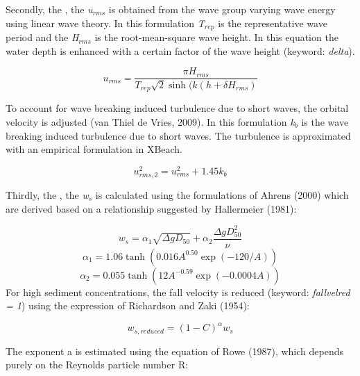 \documentclass{article}
\begin{document}
\noindent Secondly, the , the \textit{u${}_{rms}$} is obtained from the wave group varying wave energy using linear wave theory. In this formulation \textit{T${}_{rep}$} is the representative wave period and the \textit{H${}_{rms}$} is the root-mean-square wave height. In this equation the water depth is enhanced with a certain factor of the wave height (keyword: \textit{delta}). 

\noindent 
\begin{equation} \label{2.80)} 
u_{rms} =\frac{\pi H_{rms} }{T_{rep} \sqrt{2} \sinh (k(h+\delta H_{rms} )}  
\end{equation} 


\noindent To account for wave breaking induced turbulence due to short waves, the orbital velocity is adjusted (van Thiel de Vries, 2009). In this formulation \textit{k${}_{b}$} is the wave breaking induced turbulence due to short waves. The turbulence is approximated with an empirical formulation in XBeach.

\noindent 
\begin{equation} \label{2.81)} 
u_{rms,2}^{2} =u_{rms}^{2} +1.45k_{b}  
\end{equation} 


\noindent Thirdly, the , the \textit{w${}_{s}$} is calculated using the formulations of Ahrens (2000) which are derived based on a relationship suggested by Hallermeier (1981):

\noindent 
\begin{equation} \label{2.82)} 
w_{s} =\alpha _{1} \sqrt{\Delta gD_{50} } +\alpha _{2} \frac{\Delta gD_{50}^{2} }{\nu }  
\end{equation} 
\begin{equation} \label{2.83)} 
\alpha _{1} =1.06\tanh \left(0.016A^{0.50} \exp \left(-120/A\right)\right) 
\end{equation} 
\begin{equation} \label{2.84)} 
\alpha _{2} =0.055\tanh \left(12A^{-0.59} \exp \left(-0.0004A\right)\right) 
\end{equation} 
For high sediment concentrations, the fall velocity is reduced (keyword: \textit{fallvelred = 1}) using the expression of Richardson and Zaki (1954):

\noindent 
\begin{equation} \label{2.85)} 
w_{s,reduced} =\left(1-C\right)^{\alpha } w_{s}  
\end{equation} 


\noindent The exponent a is estimated using the equation of Rowe (1987), which depends purely on the Reynolds particle number R:
\end{document}
